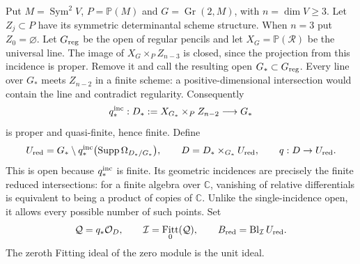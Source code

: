 \documentclass[11pt,reqno]{amsart}
\numberwithin{equation}{section}
\theoremstyle{definition}\newtheorem{definition}[theorem]{Definition}
\theoremstyle{remark}\newtheorem{remark}[theorem]{Remark}
\newcommand{\C}{\mathbb C}\newcommand{\Q}{\mathbb Q}
\newcommand{\Pj}{\mathbb P}\newcommand{\A}{\mathbb A}
\newcommand{\OO}{\mathcal O}\newcommand{\II}{\mathcal I}
\DeclareMathOperator{\Sym}{Sym}\DeclareMathOperator{\Gr}{Gr}
\DeclareMathOperator{\Fitt}{Fitt}\DeclareMathOperator{\Ann}{Ann}
\DeclareMathOperator{\Supp}{Supp}\DeclareMathOperator{\Hilb}{Hilb}
\begin{document}
Put $M=\Sym^2V$, $P=\Pj(M)$ and $G=\Gr(2,M)$, with $n=\dim V\geq3$.
Let $Z_j\subset P$ have its symmetric determinantal scheme structure.
When $n=3$ put $Z_0=\varnothing$. Let $G_{\rm reg}$ be the open of
regular pencils and let $X_G=\Pj(\mathcal R)$ be the universal line.
The image of $X_G\times_P Z_{n-3}$ is closed, since the projection
from this incidence is proper. Remove it and call the resulting open
$G_*\subset G_{\rm reg}$. Every line over $G_*$ meets $Z_{n-2}$ in
a finite scheme: a positive-dimensional intersection would contain
the line and contradict regularity. Consequently
\[
 q_*^{\rm inc}:D_*:=X_{G_*}\times_P Z_{n-2}\longrightarrow G_*
\]
is proper and quasi-finite, hence finite. Define
\begin{equation}\label{eq:reduced-open-v161}
 U_{\rm red}=G_*\setminus
 q_*^{\rm inc}\bigl(\Supp\Omega_{D_*/G_*}\bigr),\qquad
 D=D_*\times_{G_*}U_{\rm red},\qquad q:D\to U_{\rm red}.
\end{equation}
This is open because $q_*^{\rm inc}$ is finite. Its geometric
incidences are precisely the finite reduced intersections: for a
finite algebra over $\C$, vanishing of relative differentials is
equivalent to being a product of copies of $\C$. Unlike the
single-incidence open, it allows every possible number of such points.
Set
\begin{equation}\label{eq:fitting-centre-v161}
 \mathcal Q=q_*\OO_D,\qquad
 \mathcal I=\Fitt_0(\mathcal Q),\qquad
 B_{\rm red}=\operatorname{Bl}_{\mathcal I}U_{\rm red}.
\end{equation}
The zeroth Fitting ideal of the zero module is the unit ideal.
\end{document}

